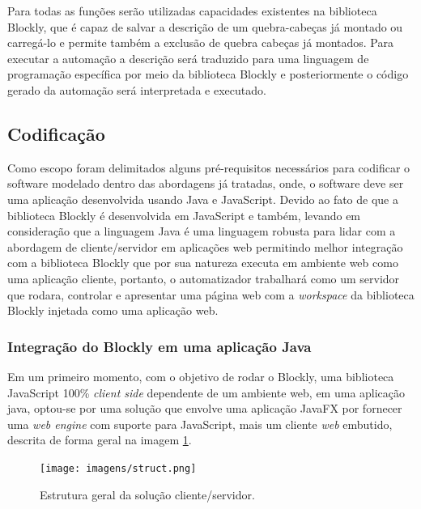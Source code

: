 \documentclass[tg]{mdtufsm}
\begin{document}
                Para todas as funções serão utilizadas capacidades existentes na biblioteca Blockly, que é capaz de salvar a descrição de um quebra-cabeças já montado ou carregá-lo e permite também a exclusão de quebra cabeças já montados. Para executar a automação a descrição será traduzido para uma linguagem de programação específica por meio da biblioteca Blockly e posteriormente o código gerado da automação será interpretada e executado.

            \subsection {Codificação}

                Como escopo foram delimitados alguns pré-requisitos necessários para codificar o software modelado dentro das abordagens já tratadas, onde, o software deve ser uma aplicação desenvolvida usando Java e JavaScript. Devido ao fato de que a biblioteca Blockly é desenvolvida em JavaScript e também, levando em consideração que a linguagem Java é uma linguagem robusta para lidar com a abordagem de cliente/servidor em aplicações web permitindo melhor integração com a biblioteca Blockly que por sua natureza executa em ambiente web como uma aplicação cliente, portanto, o automatizador trabalhará como um servidor que rodara, controlar e apresentar uma página web com a \emph{workspace} da biblioteca Blockly injetada como uma aplicação web.

                \subsubsection {Integração do Blockly em uma aplicação Java}

                    Em um primeiro momento, com o objetivo de rodar o Blockly, uma biblioteca JavaScript 100\% \emph{client side} dependente de um ambiente web, em uma aplicação java, optou-se por uma solução que envolve uma aplicação JavaFX por fornecer uma \emph{web engine} com suporte para JavaScript, mais um cliente \emph{web} embutido, descrita de forma geral na imagem \ref{fig:struct}.

                    \begin{figure}[!htb]
                        {\centering
                        \texttt{[image: imagens/struct.png]}
                        \caption{Estrutura geral da solução cliente/servidor.}
                        \label{fig:struct}}
                    \end{figure}
\end{document}
